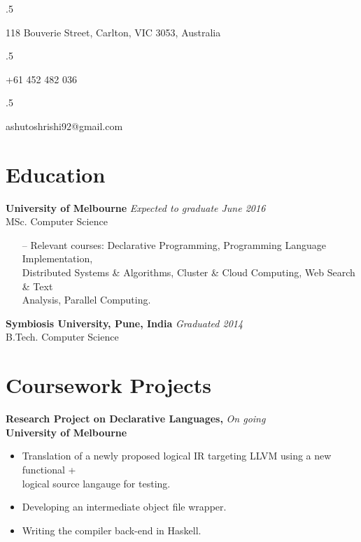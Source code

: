 \documentclass[a4paper,overlapped]{res}
\begin{document}


\begin{resume}
  \moveleft.5\hoffset\centerline{118 Bouverie Street, Carlton, VIC 3053, Australia}
  \moveleft.5\hoffset\centerline{+61 452 482 036}
  \moveleft.5\hoffset\centerline{ashutoshrishi92@gmail.com}

  \section{Education}  
  \textbf{University of Melbourne} \hfill \textit{Expected to graduate June 2016} \\
  MSc. Computer Science 
  \begin{itemize} \itemsep -2pt
  \item[--] Relevant courses: Declarative Programming, 
    Programming Language Implementation, \\ Distributed Systems \&
    Algorithms, Cluster \& Cloud Computing, Web Search \& Text \\ 
    Analysis, Parallel Computing.
  \end{itemize}

  \textbf{Symbiosis University, Pune, India} \hfill \textit{Graduated 2014} \\
  B.Tech. Computer Science 


  \section{Coursework Projects}
  
  \textbf{Research Project on Declarative Languages,} \hfill \textit{On going}\\
  \textbf{University of Melbourne}
  \begin{itemize}
  \item Translation of a newly proposed logical IR targeting LLVM using a new
    functional + \\ logical source langauge for testing.
  \item Developing an intermediate object file wrapper.
  \item Writing the compiler back-end in Haskell.
  \end{itemize}


\end{resume}
\end{document}
